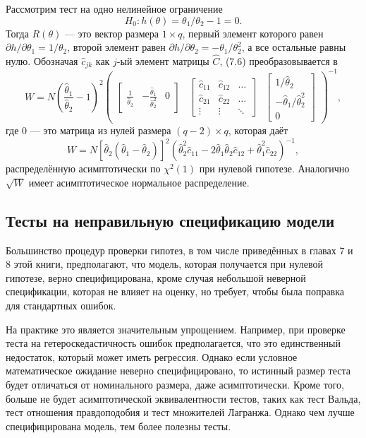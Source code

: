 Рассмотрим тест на одно нелинейное ограничение
\[
H_0: h(\theta) = \theta_1/\theta_2 - 1 = 0.
\]
Тогда $R(\theta)$ --- это вектор размера $1 \times q$, первый элемент которого равен $\partial{h}/\partial{\theta_1} = 1/\theta_2$, второй элемент равен $\partial{h}/\partial{\theta_2} = - \theta_1/\theta_2^2$, а все остальные равны нулю. Обозначая $\hat{c}_{jk}$ как $j$-ый элемент матрицы $\hat{C}$, (7.6) преобразовывается в
\[
W = N\left(\frac{\hat{\theta}_1}{\hat{\theta}_2} - 1\right)^2 \begin{pmatrix} \begin{bmatrix} \frac{1}{\hat{\theta}_2} & -\frac{\hat{\theta}_1}{\hat{\theta}_2^2} & 0 \end{bmatrix} & \begin{bmatrix} \hat{c}_{11} & \hat{c}_{12} & \dots \\ \hat{c}_{21} & \hat{c}_{22} & \dots \\ \vdots & \vdots & \ddots \end{bmatrix} & \begin{bmatrix} 1/\hat{\theta}_2 \\ - \hat{\theta}_1 / \hat{\theta}_2^2 \\ 0 \end{bmatrix} \end{pmatrix}^{-1},
\]
где $0$ --- это матрица из нулей размера $(q - 2) \times q$, которая даёт 
\begin{equation}
W = N[\hat{\theta}_2(\hat{\theta}_1 - \hat{\theta}_2)]^2(\hat{\theta}_2^2\hat{c}_{11} - 2\hat{\theta}_1\hat{\theta}_2\hat{c}_{12} + \hat{\theta}_1^2\hat{c}_{22})^{-1},
\end{equation}
распределённую асимптотически по $\chi^2(1)$ при нулевой гипотезе. Аналогично $\sqrt{W}$ имеет асимптотическое нормальное распределение.

\subsection{Тесты на неправильную спецификацию модели}

Большинство процедур проверки гипотез, в том числе приведённых в главах 7 и 8 этой книги, предполагают, что модель, которая получается при нулевой гипотезе, верно специфицирована, кроме случая небольшой неверной спецификации, которая не влияет на оценку, но требует, чтобы была поправка для стандартных ошибок.

На практике это является значительным упрощением. Например, при проверке теста на гетероскедастичность ошибок предполагается, что это единственный недостаток, который может иметь регрессия. Однако если условное математическое ожидание неверно специфицировано, то истинный размер теста будет отличаться от номинального размера, даже асимптотически. Кроме того, больше не будет асимптотической эквивалентности тестов, таких как тест Вальда, тест отношения правдоподобия и тест множителей Лагранжа. Однако чем лучше специфицирована модель, тем более полезны тесты.


